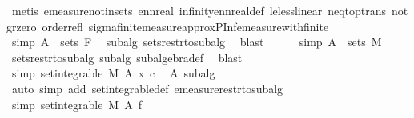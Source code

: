 \begin{isabellebody}
\ {\isacharparenleft}{\kern0pt}metis\ emeasure{\isacharunderscore}{\kern0pt}notin{\isacharunderscore}{\kern0pt}sets\ ennreal{\isacharunderscore}{\kern0pt}{}\ infinity{\isacharunderscore}{\kern0pt}ennreal{\isacharunderscore}{\kern0pt}def\ le{\isacharunderscore}{\kern0pt}less{\isacharunderscore}{\kern0pt}linear\ neq{\isacharunderscore}{\kern0pt}top{\isacharunderscore}{\kern0pt}trans\ not{\isacharunderscore}{\kern0pt}gr{\isacharunderscore}{\kern0pt}zero\ order{\isacharunderscore}{\kern0pt}refl\ sigma{\isacharunderscore}{\kern0pt}finite{\isacharunderscore}{\kern0pt}measure{\isachardot}{\kern0pt}approx{\isacharunderscore}{\kern0pt}PInf{\isacharunderscore}{\kern0pt}emeasure{\isacharunderscore}{\kern0pt}with{\isacharunderscore}{\kern0pt}finite{\isacharparenright}{\kern0pt}\isanewline
\ \ \ \ \isamarkupfalse%
\ {\isacharbrackleft}{\kern0pt}simp{\isacharbrackright}{\kern0pt}{\isacharcolon}{\kern0pt}\ {\isachardoublequoteopen}A\ {\isasymin}\ sets\ F{\isachardoublequoteclose}\ \isamarkupfalse%
\ subalg\ sets{\isacharunderscore}{\kern0pt}restr{\isacharunderscore}{\kern0pt}to{\isacharunderscore}{\kern0pt}subalg\ \isamarkupfalse%
\ blast\isanewline
\ \ \ \ \isamarkupfalse%
\ {\isacharbrackleft}{\kern0pt}simp{\isacharbrackright}{\kern0pt}{\isacharcolon}{\kern0pt}\ {\isachardoublequoteopen}A\ {\isasymin}\ sets\ M{\isachardoublequoteclose}\ \isamarkupfalse%
\ sets{\isacharunderscore}{\kern0pt}restr{\isacharunderscore}{\kern0pt}to{\isacharunderscore}{\kern0pt}subalg\ subalg\ subalgebra{\isacharunderscore}{\kern0pt}def\ \isamarkupfalse%
\ blast\isanewline
\ \ \ \ \isamarkupfalse%
\ {\isacharbrackleft}{\kern0pt}simp{\isacharbrackright}{\kern0pt}{\isacharcolon}{\kern0pt}\ {\isachardoublequoteopen}set{\isacharunderscore}{\kern0pt}integrable\ M\ A\ {\isacharparenleft}{\kern0pt}{\isasymlambda}x{\isachardot}{\kern0pt}\ c{\isacharparenright}{\kern0pt}{\isachardoublequoteclose}\ \isamarkupfalse%
\ A\ subalg\ \isamarkupfalse%
\ {\isacharparenleft}{\kern0pt}auto\ simp\ add{\isacharcolon}{\kern0pt}\ set{\isacharunderscore}{\kern0pt}integrable{\isacharunderscore}{\kern0pt}def\ emeasure{\isacharunderscore}{\kern0pt}restr{\isacharunderscore}{\kern0pt}to{\isacharunderscore}{\kern0pt}subalg{\isacharparenright}{\kern0pt}\ \isanewline
\ \ \ \ \isamarkupfalse%
\ {\isacharbrackleft}{\kern0pt}simp{\isacharbrackright}{\kern0pt}{\isacharcolon}{\kern0pt}\ {\isachardoublequoteopen}set{\isacharunderscore}{\kern0pt}integrable\ M\ A\ f{\isachardoublequoteclose}\ \isamarkupfalse%

\end{isabellebody}
